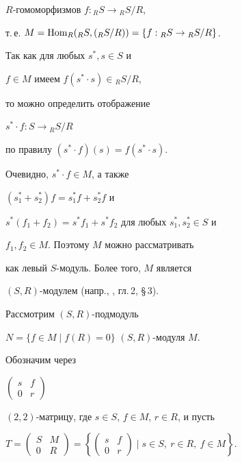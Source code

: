\begin{exam}
$R$-гомоморфизмов $f: {_R}S \rightarrow {_R}S/R$,


т.\,е. $M=\Hom_{R} ({_R}{S},({_R}{S}/R))=


\{ f: {_R}S \rightarrow {_R}S/R \}$. 





Так как для любых $s^*,s \in S$ и 


$f \in M$ имеем $f(s^* \cdot s) \in {_R}S/R$,


то можно определить отображение 


$s^* \cdot f: S \rightarrow {_R}S/R$ 


по правилу $(s^* \cdot f)(s)=f(s^* \cdot s)$. 


Очевидно, $s^* \cdot f \in M$, а также 


$(s_1^*+s_2^*)f=s_1^*f+ s_2^*f$ и 


$s^*(f_1+f_2)=s^*f_1+ s^*f_2$ для любых $s_1^*,s_2^* \in S$ и


$f_1,f_2 \in M$. Поэтому $M$ можно рассматривать


как левый $S$-модуль. Более того, $M$ является 


$(S,R)$-модулем (напр., \cite{cartan}, гл.\,2, \S\,3). 





Рассмотрим $(S,R)$-подмодуль 


$N=\{ f\in M \mid f(R) =0 \}$ $(S,R)$-модуля $M$.





Обозначим через 


$\left(\begin{smallmatrix} {s} & {f} \\ {0} & {r} \end{smallmatrix}\right)$


$(2,2)$-матрицу, где $s \in S$, $f \in M$, $r \in R$, и пусть


$T=\left(\begin{smallmatrix} {S} & {M} \\ {0} & {R}\end{smallmatrix}\right)


=\left\{\left(\begin{smallmatrix}


{s} & {f} \\ {0} & {r} \end{smallmatrix}\right)


\mid s \in S,\ r \in R,\ f\in M \right\}$. 



\end{exam}
